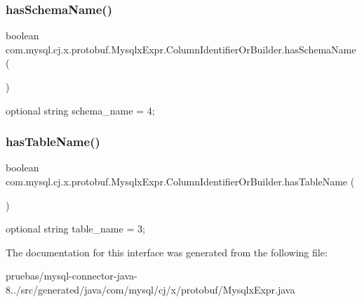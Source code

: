 \subsubsection{\texorpdfstring{has\+Schema\+Name()}{hasSchemaName()}}
{\footnotesize\ttfamily boolean com.\+mysql.\+cj.\+x.\+protobuf.\+Mysqlx\+Expr.\+Column\+Identifier\+Or\+Builder.\+has\+Schema\+Name (\begin{DoxyParamCaption}{ }\end{DoxyParamCaption})}

{\ttfamily optional string schema\+\_\+name = 4;} \mbox{\label{interfacecom_1_1mysql_1_1cj_1_1x_1_1protobuf_1_1_mysqlx_expr_1_1_column_identifier_or_builder_a5b032f4d4832a223b8cba49405d8be69}} 
\subsubsection{\texorpdfstring{has\+Table\+Name()}{hasTableName()}}
{\footnotesize\ttfamily boolean com.\+mysql.\+cj.\+x.\+protobuf.\+Mysqlx\+Expr.\+Column\+Identifier\+Or\+Builder.\+has\+Table\+Name (\begin{DoxyParamCaption}{ }\end{DoxyParamCaption})}

{\ttfamily optional string table\+\_\+name = 3;} 

The documentation for this interface was generated from the following file\+:\begin{DoxyCompactItemize}
\item 
pruebas/mysql-\/connector-\/java-\/8../src/generated/java/com/mysql/cj/x/protobuf/Mysqlx\+Expr.\+java\end{DoxyCompactItemize}

